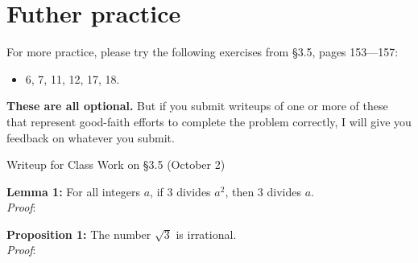\documentclass[11pt]{article}
\begin{document}
\section*{Futher practice}
For more practice, please try the following exercises from \S3.5, pages 153---157: 
\begin{itemize}
	\item 6, 7, 11, 12, 17, 18. 
\end{itemize}
\textbf{These are all optional. }
But if you submit writeups of one or more of these that represent good-faith efforts to complete the problem correctly, I will give you feedback on whatever you submit. 

\newpage

\begin{center}
	\begin{Large}
		Writeup for Class Work on \S3.5 (October 2)
	\end{Large}
	
\end{center}

\noindent
\textbf{Lemma 1:} For all integers $a$, if $3$ divides $a^2$, then $3$ divides $a$. \\

\noindent
\emph{Proof}: 

\vspace{5in}


\noindent
\textbf{Proposition 1:} The number $\sqrt{3}$ is irrational. \\

\noindent
\emph{Proof}:
\end{document}
